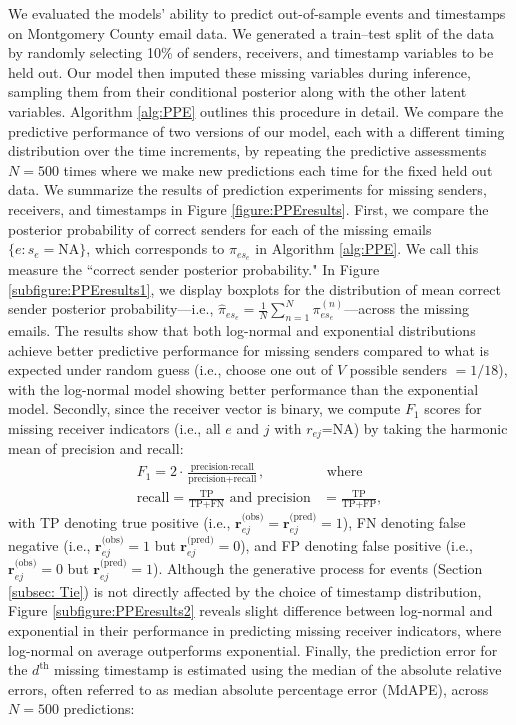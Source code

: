 \documentclass[ba]{imsart}
\numberwithin{equation}{section}
\theoremstyle{plain}
\begin{document}
	We evaluated the models' ability to predict out-of-sample events and timestamps on Montgomery County email data. We generated a train--test split of the data by randomly selecting 10\% of senders, receivers, and timestamp variables to be held out. Our model then imputed these missing variables during inference, sampling them from their conditional posterior along with the other latent variables. Algorithm \ref{alg:PPE} outlines this procedure in detail. We compare the predictive performance of two versions of our model, each with a different timing distribution over the time increments, by repeating the predictive assessments$N=500$ times where we make new predictions each time for the fixed held out data. We summarize the results of prediction experiments for missing senders, receivers, and timestamps in Figure \ref{figure:PPEresults}. First, we compare the posterior probability of correct senders for each of the missing emails $\{e:s_e=\mbox{NA}\}$, which corresponds to $\pi_{es_e}$ in Algorithm \ref{alg:PPE}. We call this measure the ``correct sender posterior probability." In Figure \ref{subfigure:PPEresults1}, we display boxplots for the distribution of mean correct sender posterior probability---i.e., $\hat{\pi}_{es_{e}} = \frac{1}{N}\sum_{n=1}^N \pi^{(n)}_{es_{e}}$---across the missing emails. The results show that both log-normal and exponential distributions achieve better predictive performance for missing senders compared to what is expected under random guess (i.e., choose one out of $V$ possible senders $=1/18$), with the log-normal model showing better performance than the exponential model. Secondly, since the receiver vector is binary, we compute $F_1$ scores for missing receiver indicators (i.e., all $e$ and $j$ with $r_{ej}$=NA) by taking the harmonic mean of precision and recall:
	\begin{equation}
		\begin{aligned}
			F_1 =2\cdot\frac{\mbox{precision}\cdot \mbox{recall}}{\mbox{precision}+ \mbox{recall}}, &\mbox{ where } \\
			\mbox{recall}  = \frac{\mbox{TP}}{\mbox{TP+FN}} \mbox{ and } \mbox{precision} & =\frac{\mbox{TP}}{\mbox{TP+FP}},
		\end{aligned}
	\end{equation}
with TP denoting true positive (i.e., $\boldsymbol{r}^{\textrm{(obs)}}_{ej}=\boldsymbol{r}^{\textrm{(pred)}}_{ej}=1$), FN denoting false negative (i.e., $\boldsymbol{r}^{\textrm{(obs)}}_{ej}=1$ but $\boldsymbol{r}^{\textrm{(pred)}}_{ej}=0$), and FP denoting false positive (i.e., $\boldsymbol{r}^{\textrm{(obs)}}_{ej}=0$ but $\boldsymbol{r}^{\textrm{(pred)}}_{ej}=1$). Although the generative process for events (Section \ref{subsec: Tie}) is not directly affected by the choice of timestamp distribution, Figure \ref{subfigure:PPEresults2} reveals slight difference between log-normal and exponential in their performance in predicting missing receiver indicators, where log-normal on average outperforms exponential. Finally, the prediction error for the $d^{\textrm{th}}$ missing timestamp is estimated using the median of the absolute relative errors, often referred to as median absolute percentage error (MdAPE), across $N=500$ predictions:
\end{document}
